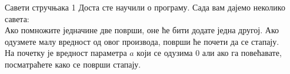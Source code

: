 \begin{surferPage}{Савети стручњака 1}
Доста сте научили о програму. Сада вам дајемо неколико савета:\\
\vspace{0.3cm}
Ако помножите једначине две површи, оне ће бити додате једна другој. Ако одузмете малу вредност од овог производа, површи ће почети да се стапају.\\
\vspace{0.3cm}
На почетку је вредност параметра $a$ који се одузима 0 али ако га повећавате, посматраћете како се површи стапају.
\end{surferPage}
